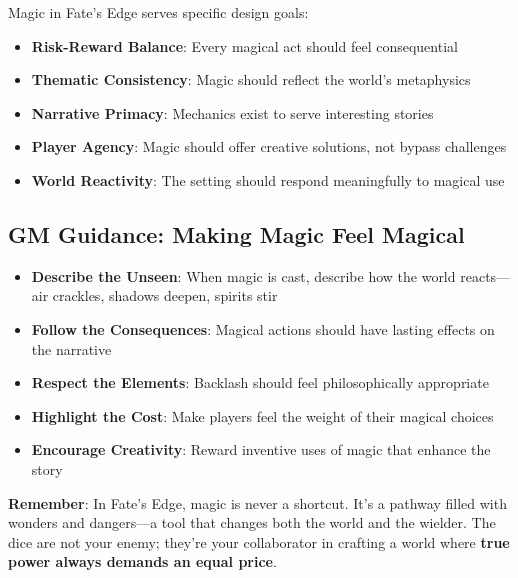 Magic in Fate's Edge serves specific design goals:

\begin{itemize}
    \item \textbf{Risk-Reward Balance}: Every magical act should feel consequential
    \item \textbf{Thematic Consistency}: Magic should reflect the world's metaphysics
    \item \textbf{Narrative Primacy}: Mechanics exist to serve interesting stories
    \item \textbf{Player Agency}: Magic should offer creative solutions, not bypass challenges
    \item \textbf{World Reactivity}: The setting should respond meaningfully to magical use
\end{itemize}

\subsection*{GM Guidance: Making Magic Feel Magical}

\begin{itemize}
    \item \textbf{Describe the Unseen}: When magic is cast, describe how the world reacts—air crackles, shadows deepen, spirits stir
    \item \textbf{Follow the Consequences}: Magical actions should have lasting effects on the narrative
    \item \textbf{Respect the Elements}: Backlash should feel philosophically appropriate
    \item \textbf{Highlight the Cost}: Make players feel the weight of their magical choices
    \item \textbf{Encourage Creativity}: Reward inventive uses of magic that enhance the story
\end{itemize}

\textbf{Remember}: In Fate's Edge, magic is never a shortcut. It's a pathway filled with wonders and dangers—a tool that changes both the world and the wielder. The dice are not your enemy; they're your collaborator in crafting a world where \textbf{true power always demands an equal price}.

